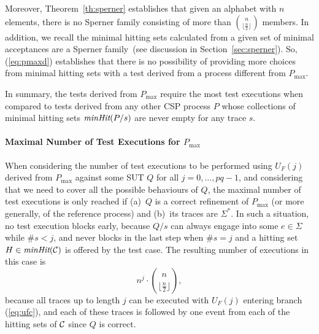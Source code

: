 \documentclass[3p,times]{elsarticle}
\newcommand{\trc}{\text{\it traces}}
\newcommand{\minhits}{\text{\it minHit}}
\newcommand{\pmax}{P_\text{max}}
\begin{document}
Moreover, Theorem~\ref{th:sperner} establishes that given an alphabet with
$n$ elements, there is no Sperner family consisting of more than
$\binom{n}{\lfloor\frac{n}{2}\rfloor}$ members. In addition, we recall the minimal
hitting sets calculated from a given set of minimal acceptances are a Sperner
family~(see discussion in Section~\ref{sec:sperner}). So, (\ref{eq:pmaxd})
establishes that there is no possibility of providing more choices from
minimal hitting sets with a test derived from a process different from
$\pmax$.

In summary, the tests derived from $\pmax$ require the most test executions
when compared to tests derived from any other CSP process $P$ whose
collections of minimal hitting sets $\minhits(P/s)$ are never empty for any
trace $s$.

\paragraph{Maximal Number of Test Executions for $\pmax$}
When considering the number of test executions to be performed using $U_F(j)$
derived from $\pmax$ against some SUT $Q$ for all $j = 0,\dots,pq-1$, and
considering that we need to cover all the possible behaviours of $Q$, the
maximal number of test executions is only reached if (a)~$Q$ is a correct
refinement of $\pmax$ (or more generally, of the reference process) and
(b)~its traces are $\Sigma^*$.
%
In such a situation, no test execution blocks early, because $Q/s$ can always
engage into some $e\in\Sigma$  while $\#s<j$, and never blocks in the last
step when $\#s = j$ and a hitting set $H\in\minhits({\cal C})$ is offered by
the test case. The resulting number of executions in this case is
%
\begin{equation}
\label{eq:maxexec}
n^{j}\cdot \binom{n}{\lfloor\frac{n}{2}\rfloor},
\end{equation}
%
because all traces up to length $j$ can be executed with $U_F(j)$
entering branch (\ref{eq:ufc}), and each of these traces is followed by one
event from each of the hitting sets of ${\cal C}$ since $Q$ is correct.  %
\end{document}
